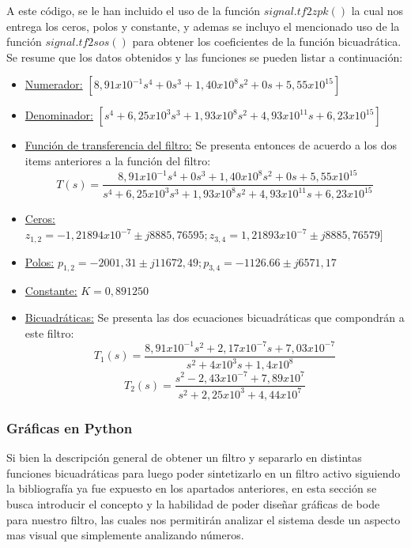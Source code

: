 \documentclass[12pt,a4paper]{article}
\begin{document}
A este código, se le han incluido el uso de la función $signal.tf2zpk()$ la cual nos entrega los ceros, polos y constante, y ademas se incluyo el mencionado uso de la función $signal.tf2sos()$ para obtener los coeficientes de la función bicuadrática. Se resume que los datos obtenidos y las funciones se pueden listar a continuación:

\begin{itemize}
    \item \underline{Numerador:} $[8,91x10^{-1}s^{4} + 0s^{3} + 1,40x10^{8}s^{2} + 0s + 5,55x10^{15}]$
    \item \underline{Denominador:} $[s^{4} + 6,25x10^{3}s^{3} + 1,93x10^{8}s^{2} + 4,93x10^{11}s + 6,23x10^{15}]$
    \item \underline{Función de transferencia del filtro:} Se presenta entonces de acuerdo a los dos items anteriores a la función del filtro:
    \begin{equation}
        \label{eq_4}
        T(s) = \frac{8,91x10^{-1}s^{4} + 0s^{3} + 1,40x10^{8}s^{2} + 0s + 5,55x10^{15}}{s^{4} + 6,25x10^{3}s^{3} + 1,93x10^{8}s^{2} + 4,93x10^{11}s + 6,23x10^{15}}
    \end{equation}
    \item \underline{Ceros:} $z_{1,2} = -1,21894x10^{-7} \pm j8885,76595 ; z_{3,4} =  1,21893x10^{-7} \pm j8885,76579]$
    \item \underline{Polos:} $p_{1,2} = -2001,31 \pm j11672,49 ; p_{3,4}= -1126.66 \pm j6571,17$
    \item \underline{Constante:} $K = 0,891250$
    \item \underline{Bicuadráticas:} Se presenta las dos ecuaciones bicuadráticas que compondrán a este filtro:
    \begin{equation}
        \label{eq_5}
        T_{1}(s) = \frac{8,91x10^{-1}s^{2} + 2,17x10^{-7}s + 7,03x10^{-7}}{s^{2} + 4x10^3s + 1,4x10^{8}}
    \end{equation}
    \begin{equation}
        \label{eq_6}
        T_{2}(s) = \frac{s^{2} - 2,43x10^{-7} + 7,89x10^{7}}{s^{2} + 2,25x10^{3} + 4,44x10^{7}}
    \end{equation}
\end{itemize}



\subsubsection{Gráficas en Python}
Si bien la descripción general de obtener un filtro y separarlo en distintas funciones bicuadráticas para luego poder sintetizarlo en un filtro activo siguiendo la bibliografía ya fue expuesto en los apartados anteriores, en esta sección se busca introducir el concepto y la habilidad de poder diseñar gráficas de bode para nuestro filtro, las cuales nos permitirán analizar el sistema desde un aspecto mas visual que simplemente analizando números.
\end{document}
